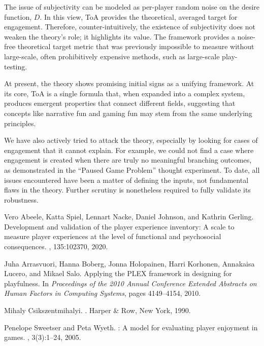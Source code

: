 \documentclass{article}
\begin{document}
The issue of subjectivity can be modeled as per-player random noise on the desire function, $D$. In this view, ToA provides the theoretical, averaged target for engagement. Therefore, counter-intuitively, the existence of subjectivity does not weaken the theory's role; it highlights its value. The framework provides a noise-free theoretical target metric that was previously impossible to measure without large-scale, often prohibitively expensive methods, such as large-scale play-testing.

At present, the theory shows promising initial signs as a unifying framework. At its core, ToA is a single formula that, when expanded into a complex system, produces emergent properties that connect different fields, suggesting that concepts like narrative fun and gaming fun may stem from the same underlying principles.

We have also actively tried to attack the theory, especially by looking for cases of engagement that it cannot explain. For example, we could not find a case where engagement is created when there are truly no meaningful branching outcomes, as demonstrated in the ``Paused Game Problem'' thought experiment. To date, all issues encountered have been a matter of defining the inputs, not fundamental flaws in the theory. Further scrutiny is nonetheless required to fully validate its robustness.

\begin{thebibliography}{1}

Vero Abeele, Katta Spiel, Lennart Nacke, Daniel Johnson, and Kathrin Gerling.
\newblock Development and validation of the player experience inventory: A scale to measure player experiences at the level of functional and psychosocial consequences.
, 135:102370, 2020.

Juha Arrasvuori, Hanna Boberg, Jonna Holopainen, Harri Korhonen, Annakaisa Lucero, and Mikael Salo.
\newblock Applying the {PLEX} framework in designing for playfulness.
\newblock In {\em Proceedings of the 2010 Annual Conference Extended Abstracts on Human Factors in Computing Systems}, pages 4149--4154, 2010.

Mihaly Csikszentmihalyi.
.
\newblock Harper \& Row, New York, 1990.

Penelope Sweetser and Peta Wyeth.
: A model for evaluating player enjoyment in games.
, 3(3):1--24, 2005.

\end{thebibliography}
\end{document}
